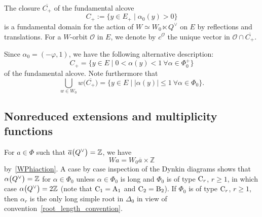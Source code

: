 The closure $\overline{C_+}$ of the fundamental alcove
\begin{equation*}%
C_+:=\{y\in E_+ \mid \alpha_0(y)>0\}
\end{equation*}
is a fundamental domain for the action of $W\simeq W_0\ltimes Q^\vee$ on $E$ by reflections and translations.
For a $W$-orbit $\mathcal{O}$ in $E$, we denote by
$c^\mathcal{O}$ the unique vector in $\mathcal{O}\cap \overline{C_+}$.

Since $\alpha_0=(-\varphi,1)$, we have the following alternative description:
\[
C_+=\bigl\{y\in E \mid 0<\alpha(y)<1 \ \forall \alpha\in\Phi_0^+\bigr\}
\]
of the fundamental alcove.
Note furthermore that
\begin{equation}\label{W0C}
\bigcup_{w\in W_0}w\bigl(\overline{C_+}\bigr)=\{y\in E \mid |\alpha(y)|\leq 1\ \forall \alpha\in\Phi_0\}.
\end{equation}

\subsection{Nonreduced extensions and multiplicity functions}

For $a\in\Phi$ such that $\overline{a}\smash{\bigl(Q^\vee\bigr)}=\mathbb{Z}$, we have
\[
Wa=W_0 \overline{a}\times\mathbb{Z}
\]
by~\eqref{WPhiaction}. A case by case inspection of the Dynkin diagrams shows that $\alpha\smash{\bigl(Q^\vee\bigr)}=\mathbb{Z}$ for $\alpha\in\Phi_0$ unless $\alpha\in\Phi_0$ is long and
 $\Phi_0$ is of type ${\rm C}_r$, $r\geq 1$, in which case $\alpha\smash{\bigl(Q^\vee\bigr)}=2\mathbb{Z}$ (note that ${\rm C}_1=\textup{A}_1$ and ${\rm C}_2=\textup{B}_2$).
If $\Phi_0$ is of type ${\rm C}_r$, $r\geq 1$, then $\alpha_r$ is the only long simple root in $\Delta_0$ in view of convention~\ref{root_length_convention}.

